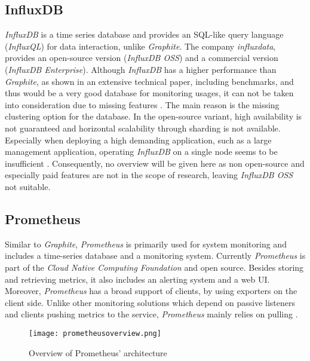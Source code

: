 \subsection{InfluxDB}

\textit{InfluxDB} is a time series database and provides an SQL-like query language (\textit{InfluxQL}) for data interaction, unlike \textit{Graphite}.
The company \textit{influxdata}, provides an open-source version (\textit{InfluxDB OSS}) and a commercial version (\textit{InfluxDB Enterprise}).
Although \textit{InfluxDB} has a higher performance than \textit{Graphite}, as shown in an extensive technical paper, including benchmarks, and thus would be a very good database for monitoring usages, it can not be taken into consideration due to missing features \cite{influxdata.2019}.
The main reason is the missing clustering option for the database.
In the open-source variant, high availability is not guaranteed and horizontal scalability through sharding is not available.
Especially when deploying a high demanding application, such as a large management application, operating \textit{InfluxDB} on a single node seems to be insufficient \cite{influxdata.2020}.
Consequently, no overview will be given here as non open-source and especially paid features are not in the scope of research, leaving \textit{InfluxDB OSS} not suitable.

\subsection{Prometheus}

Similar to \textit{Graphite}, \textit{Prometheus} is primarily used for system monitoring and includes a time-series database and a monitoring system.
Currently \textit{Prometheus} is part of the \textit{Cloud Native Computing Foundation} and open source.
Besides storing and retrieving metrics, it also includes an alerting system and a web \ac{UI}.
Moreover, \textit{Prometheus} has a broad support of clients, by using exporters on the client side.
Unlike other monitoring solutions which depend on passive listeners and clients pushing metrics to the service, \textit{Prometheus} mainly relies on pulling \cite{Berman.2018}\cite{PrometheusAuthors.30.05.2020}.

\begin{figure}
	\centering
	\texttt{[image: prometheusoverview.png]}
	\caption{Overview of Prometheus' architecture \cite{PrometheusAuthors.30.05.2020}}
	\label{img:prometheusoverview}
\end{figure}

